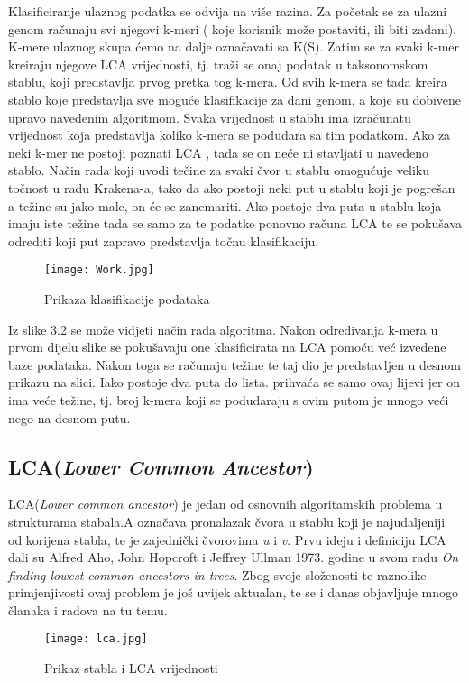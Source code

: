 \documentclass[times, utf8, zavrsni]{fer}
\begin{document}
{Klasificiranje ulaznog podatka se odvija na više razina. Za početak se za ulazni genom računaju svi njegovi k-meri ( koje korisnik može postaviti, ili biti zadani). K-mere ulaznog skupa ćemo na dalje označavati sa K(S). Zatim se za svaki k-mer kreiraju njegove LCA vrijednosti, tj. traži se onaj podatak u taksonomskom stablu, koji predstavlja prvog pretka tog k-mera. Od svih k-mera se tada kreira stablo koje predstavlja sve moguće klasifikacije za dani genom, a koje su dobivene upravo navedenim algoritmom. Svaka vrijednost u stablu ima izračunatu vrijednost koja predstavlja koliko k-mera se podudara sa tim podatkom. Ako za neki k-mer ne postoji poznati LCA , tada se on neće ni stavljati u navedeno stablo. Način rada koji uvodi tečine za svaki čvor u stablu omogućuje veliku točnost u radu Krakena-a, tako da ako postoji neki put u stablu koji je pogrešan a težine su jako male, on će se zanemariti. Ako postoje dva puta u stablu koja imaju iste težine tada se samo za te podatke ponovno računa LCA te se pokušava odrediti koji put zapravo predstavlja točnu klasifikaciju.

\begin{figure}[!htbp]
	\centering
	\texttt{[image: Work.jpg]}
	\caption{Prikaza klasifikacije podataka}
	\label{Klasifikacija}
\end{figure}

Iz slike 3.2 se može vidjeti način rada algoritma. Nakon određivanja k-mera u prvom dijelu slike se pokušavaju one klasificirata na LCA pomoću već izvedene baze podataka. Nakon toga se računaju težine te taj dio je predstavljen u desnom prikazu na slici. Iako postoje dva puta do lista. prihvaća se samo ovaj lijevi jer on ima veće težine, tj. broj k-mera koji se podudaraju s ovim putom je mnogo veći nego na desnom putu.


\subsection{LCA(\textit{Lower Common Ancestor})}
LCA(\textit{Lower common ancestor}) je jedan od osnovnih algoritamskih problema u strukturama stabala.A označava pronalazak čvora u stablu koji je najudaljeniji od korijena stabla, te je zajednički čvorovima \textit{u} i \textit{v}. Prvu ideju i definiciju LCA dali su Alfred Aho, John Hopcroft i Jeffrey Ullman 1973. godine u svom radu \textit{On finding lowest common ancestors in trees}. Zbog svoje složenosti te raznolike primjenjivosti ovaj problem je još uvijek aktualan, te se i danas objavljuje mnogo članaka i radova na tu temu.
\begin{figure}[!htbp]
	\centering
	\texttt{[image: lca.jpg]}
	\caption{Prikaz stabla i LCA vrijednosti}
	\label{LCA}
\end{figure}

}
\end{document}
